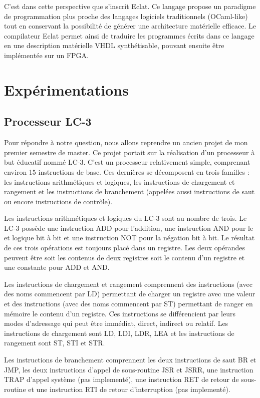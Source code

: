 \documentclass{article}
\begin{document}
C'est dans cette perspective que s'inscrit Eclat. Ce langage propose un paradigme de programmation plus proche des langages logiciels traditionnels (OCaml-like) 
tout en conservant la possibilité de générer une architecture matérielle efficace. Le compilateur Eclat permet ainsi de traduire 
les programmes écrits dans ce langage en une description matérielle VHDL synthétisable, pouvant ensuite être implémentée sur un FPGA.

\newpage
\section{Expérimentations}
\subsection{Processeur LC-3}
Pour répondre à notre question, nous allons reprendre un ancien projet de mon premier semestre de master. Ce projet portait sur la réalisation d'un 
processeur à but éducatif nommé LC-3. C'est un processeur relativement simple, comprenant environ 15 instructions de base. Ces dernières se décomposent 
en trois familles : les instructions arithmétiques et logiques, les instructions de chargement et rangement et les instructions de 
branchement (appelées aussi instructions de saut ou encore instructions de contrôle).

Les instructions arithmétiques et logiques du LC-3 sont au nombre de trois. Le LC-3 possède une
instruction ADD pour l’addition, une instruction AND pour le et logique bit à bit et une instruction NOT
pour la négation bit à bit. Le résultat de ces trois opérations est toujours placé dans un registre. Les
deux opérandes peuvent être soit les contenus de deux registres soit le contenu d’un registre et une
constante pour ADD et AND.

Les instructions de chargement et rangement comprennent des instructions (avec des noms
commencent par LD) permettant de charger un registre avec une valeur et des instructions (avec des
noms commencent par ST) permettant de ranger en mémoire le contenu d’un registre. Ces instructions
se différencient par leurs modes d’adressage qui peut être immédiat, direct, indirect ou relatif. Les
instructions de chargement sont LD, LDI, LDR, LEA et les instructions de rangement sont ST, STI et
STR.

Les instructions de branchement comprennent les deux instructions de saut BR et JMP, les deux
instructions d’appel de sous-routine JSR et JSRR, une instruction TRAP d’appel système (pas implementé), une
instruction RET de retour de sous-routine et une instruction RTI de retour d’interruption (pas implementé).
\end{document}
